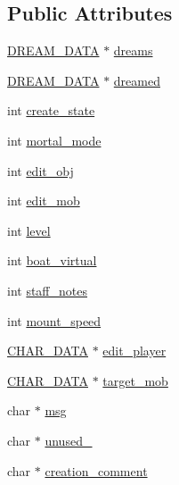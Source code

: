 \subsection*{Public Attributes}
\begin{DoxyCompactItemize}
\item 
\hyperlink{structs_8h_ad492b5e07b2f546771248e448e429e48}{D\-R\-E\-A\-M\-\_\-\-D\-A\-T\-A} $\ast$ \hyperlink{structpc__data_aadc5d665f91b3eaeac10db002c773db9}{dreams}
\item 
\hyperlink{structs_8h_ad492b5e07b2f546771248e448e429e48}{D\-R\-E\-A\-M\-\_\-\-D\-A\-T\-A} $\ast$ \hyperlink{structpc__data_a801b74deedf291de282ff352d72c60da}{dreamed}
\item 
int \hyperlink{structpc__data_ae2a68e2b33cea8d75b41dd0cb462ba5b}{create\-\_\-state}
\item 
int \hyperlink{structpc__data_a5f5885c8484697ebb6b5e778bdcc325d}{mortal\-\_\-mode}
\item 
int \hyperlink{structpc__data_a64a53ba9021d3f6cbb4bc0888c1048c2}{edit\-\_\-obj}
\item 
int \hyperlink{structpc__data_a3898e79767a2475ee868a705361d9232}{edit\-\_\-mob}
\item 
int \hyperlink{structpc__data_a44b505b16582e9809611245a1a3ed9ec}{level}
\item 
int \hyperlink{structpc__data_a0f8190476fefeb823bae6b796323a4c2}{boat\-\_\-virtual}
\item 
int \hyperlink{structpc__data_a40ba40d49cdcd303ded9a72314b2ffb1}{staff\-\_\-notes}
\item 
int \hyperlink{structpc__data_a4bf5057035e7b5073de964fb66059f94}{mount\-\_\-speed}
\item 
\hyperlink{structs_8h_af33ed1e66e8541a08bed257124f50f31}{C\-H\-A\-R\-\_\-\-D\-A\-T\-A} $\ast$ \hyperlink{structpc__data_a544d9865d6bb12bcbd2be0a15c5deaf1}{edit\-\_\-player}
\item 
\hyperlink{structs_8h_af33ed1e66e8541a08bed257124f50f31}{C\-H\-A\-R\-\_\-\-D\-A\-T\-A} $\ast$ \hyperlink{structpc__data_a3629ee637172859656bdced07fe9cc2c}{target\-\_\-mob}
\item 
char $\ast$ \hyperlink{structpc__data_ab4e5283b6e8ce4cd35736cb59e545f11}{msg}
\item 
char $\ast$ \hyperlink{structpc__data_a4e5011cbaec85ae1765ec77d28f3f6a5}{unused\-\_}
\item 
char $\ast$ \hyperlink{structpc__data_a70d52a012df366c4fe93154d90175870}{creation\-\_\-comment}
\item 

\end{DoxyCompactItemize}

